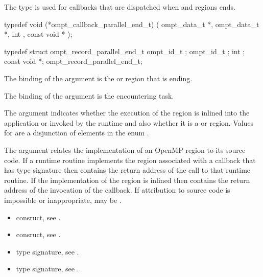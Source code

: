 \label{sec:ompt_callback_parallel_end_t}

\summary
The  type is used for callbacks 
that are dispatched when  and  regions ends.

\format
\begin{ccppspecific}
\begin{omptCallback}
typedef void (*ompt_callback_parallel_end_t) (
  ompt_data_t *,
  ompt_data_t *,
  int ,
  const void *
);
\end{omptCallback}
\end{ccppspecific}

\record
\begin{ccppspecific}
\begin{omptRecord}
typedef struct ompt_record_parallel_end_t {
  ompt_id_t ;
  ompt_id_t ;
  int ;
  const void *;
} ompt_record_parallel_end_t;
\end{omptRecord}
\end{ccppspecific}


\argdesc
The binding of the  argument is the  or 
 region that is ending.

The binding of the  argument is the encountering task.

The  argument indicates whether the execution of the region is inlined 
into the application or invoked by the runtime and also whether it is a 
 or  region. Values for  are a
disjunction of elements in the enum .

The  argument relates the implementation of an OpenMP region
to its source code. If a runtime routine implements the region associated with
a callback that has type signature  then
 contains the return address of the call to that runtime routine.
If the implementation of the region is inlined then  contains the
return address of the invocation of the callback. If attribution to source code
is impossible or inappropriate, may be .

\crossreferences
\begin{itemize}
\item {} consruct, see .

\item {} consruct, see .

\item {} type signature, see .

\item {} type signature, 
see .
\end{itemize}



